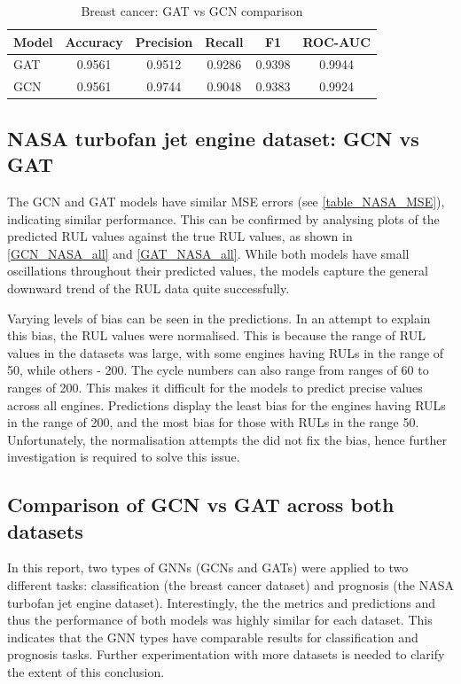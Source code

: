 \documentclass[12pt]{article}
\begin{document}
\begin{table}[H]
\centering
\caption{Breast cancer: GAT vs GCN comparison}
\begin{tabular}{|l|c|c|c|c|c|}
\hline
\textbf{Model} & \textbf{Accuracy} & \textbf{Precision} & \textbf{Recall} & \textbf{F1} & \textbf{ROC-AUC} \\
\hline
GAT & 0.9561 & 0.9512 & 0.9286 & 0.9398 & 0.9944 \\
GCN & 0.9561 & 0.9744 & 0.9048 & 0.9383 & 0.9924 \\
\hline
\end{tabular}

\end{table}

\subsection{NASA turbofan jet engine dataset: GCN vs GAT}
The GCN and GAT models have similar MSE errors (see \autoref{table_NASA_MSE}), indicating similar performance. This can be confirmed by analysing plots of the predicted RUL values against the true RUL values, as shown in \autoref{GCN_NASA_all} and \autoref{GAT_NASA_all}. While both models have small oscillations throughout their predicted values, the models capture the general downward trend of the RUL data quite successfully. 

Varying levels of bias can be seen in the predictions. In an attempt to explain this bias, the RUL values were normalised. This is because the range of RUL values in the datasets was large, with some engines having RULs in the range of 50, while others - 200. The cycle numbers can also range from ranges of 60 to ranges of 200. This makes it difficult for the models to predict precise values across all engines. Predictions display the least bias for the engines having RULs in the range of 200, and the most bias for those with RULs in the range 50. Unfortunately, the normalisation attempts the did not fix the bias, hence further investigation is required to solve this issue.

\subsection{Comparison of GCN vs GAT across both datasets}
In this report, two types of GNNs (GCNs and GATs) were applied to two different tasks: classification (the breast cancer dataset) and prognosis (the NASA turbofan jet engine dataset). Interestingly, the the metrics and predictions and thus the performance of both models was highly similar for each dataset. This indicates that the GNN types have comparable results for classification and prognosis tasks. Further experimentation with more datasets is needed to clarify the extent of this conclusion.
\end{document}
